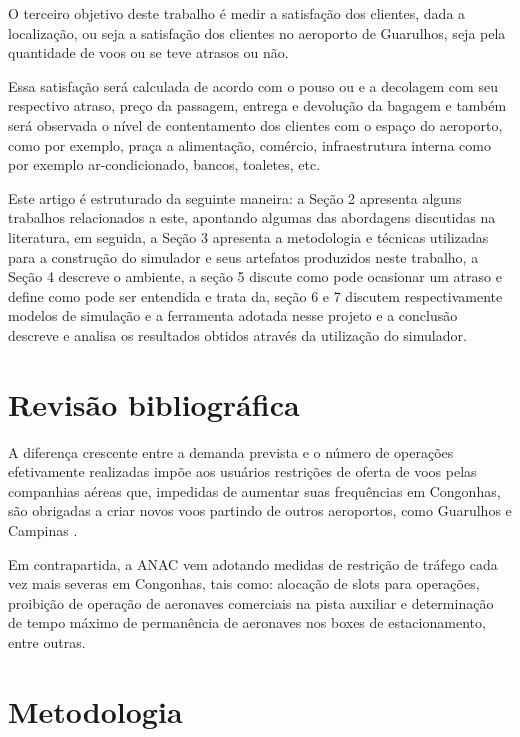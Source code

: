 \documentclass[12pt]{article}
\begin{document}
  O terceiro objetivo deste trabalho é medir a satisfação dos clientes, dada
  a localização, ou seja a satisfação dos clientes no aeroporto de Guarulhos, 
  seja pela quantidade de voos ou se teve atrasos ou não.
  
  Essa satisfação será calculada de acordo com o pouso ou e a decolagem com 
  seu respectivo atraso, preço da passagem, entrega e devolução da bagagem
  e também será observada o nível de contentamento dos clientes com o espaço
  do aeroporto, como por exemplo, praça a alimentação, comércio, 
  infraestrutura interna como por exemplo ar-condicionado, bancos, toaletes,
  etc.
  
  
  Este artigo é estruturado da seguinte maneira: a Seção 2 apresenta alguns trabalhos
  relacionados a este, apontando algumas das abordagens discutidas na literatura,
  em seguida, a Seção 3 apresenta a metodologia e técnicas utilizadas para a construção 
  do simulador e seus artefatos produzidos neste trabalho, a Seção 4 descreve o ambiente,
  a seção 5 discute como pode ocasionar um atraso e define como pode ser entendida e trata
  da, seção 6 e 7 discutem respectivamente modelos de simulação e a ferramenta adotada
  nesse projeto e a conclusão descreve e analisa os resultados obtidos através da 
  utilização do simulador.
    
  
  \section{Revisão bibliográfica} \label{sec:revisaobibliografica}
  
  A diferença crescente entre a demanda prevista e o número de
  operações efetivamente realizadas impõe aos usuários
  restrições de oferta de voos pelas companhias aéreas que,
  impedidas de aumentar suas frequências em Congonhas, são 
  obrigadas a criar novos voos partindo de outros aeroportos,
  como Guarulhos e Campinas \cite{boulic:91}.
  
  Em contrapartida, a ANAC vem adotando medidas de restrição 
  de tráfego cada vez mais severas em Congonhas, tais como: 
  alocação de slots para operações, proibição de operação de 
  aeronaves comerciais na pista auxiliar e determinação de tempo
  máximo de permanência de aeronaves nos boxes de estacionamento,
  entre outras\cite{Medau:09}. 
  
  
  \section{Metodologia}
  
\end{document}
